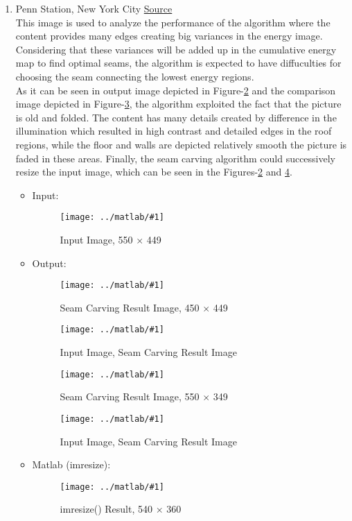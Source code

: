 \documentclass{article}
\newcommand{\listFigure}[3]{ \begin{figure}[H]
\texttt{[image: ../matlab/\#1]}
		\caption{#2\label{fig:#3}}
	\end{figure}		
}
\begin{document}
\begin{enumerate}
\begin{enumerate}
		\item Penn Station, New York City
		\href{http://animalnewyork.com/2013/awesome-map/}{Source} \\ 
		This image is used to analyze the performance of the algorithm where the
		content provides many edges creating big variances in the energy image.
		Considering that these variances will be added up in the cumulative energy map
		to find optimal seams, the algorithm is expected to have diffuculties for
		choosing the seam connecting the lowest energy regions. \\
		As it can be seen in  output image depicted
		in Figure-\ref{fig:outputPennStationW} and the comparison image depicted in
		Figure-\ref{fig:outputPennStationIOW}, the algorithm exploited the fact that
		the picture is old and folded. The content has many details
		created by difference in the illumination which resulted in high contrast and
		detailed edges in the roof regions, while the floor and walls are depicted
		relatively smooth the picture is faded in these areas.
		Finally, the seam carving algorithm could successively resize the input
		image, which can be seen in the Figures-\ref{fig:outputPennStationW}
		and \ref{fig:outputPennStationH}.
		\begin{itemize}
			\item Input:
			\listFigure{PennStation/inputPennStation.jpg}{Input Image, 550 $\times$
			449}{inputManhattan}
			\item Output:
			\listFigure{PennStation/outputPennStationW.png}{Seam Carving Result Image,
			450 $\times$ 449}{outputPennStationW} 
			\listFigure{PennStation/outputIOW.png}{Input Image, Seam Carving
			Result Image}{outputPennStationIOW}
			\listFigure{PennStation/outputPennStationH.png}{Seam Carving Result Image,
			550 $\times$ 349}{outputPennStationH} 
			\listFigure{PennStation/outputIOH.png}{Input Image, Seam Carving
			Result Image}{outputPennStationIOH} 
			\item Matlab (imresize): 
			\listFigure{PennStation/outputPennStationMatlab.png}{imresize() Result, 540
			$\times$ 360}{outputPennStationMatlab}
		\end{itemize}
		

\end{enumerate}
\end{enumerate}
\end{document}
